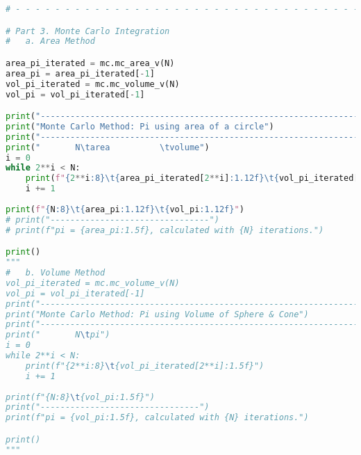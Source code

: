 \documentclass[11pt]{article}
\begin{document}
\begin{lstlisting}[language=Python]
# - - - - - - - - - - - - - - - - - - - - - - - - - - - - - - - - - - - - - - -

# Part 3. Monte Carlo Integration
#   a. Area Method

area_pi_iterated = mc.mc_area_v(N)
area_pi = area_pi_iterated[-1]
vol_pi_iterated = mc.mc_volume_v(N)
vol_pi = vol_pi_iterated[-1]

print("----------------------------------------------------------------")
print("Monte Carlo Method: Pi using area of a circle")
print("----------------------------------------------------------------")
print("       N\tarea          \tvolume")
i = 0
while 2**i < N:
    print(f"{2**i:8}\t{area_pi_iterated[2**i]:1.12f}\t{vol_pi_iterated[2**i]:1.12f}")
    i += 1
    
print(f"{N:8}\t{area_pi:1.12f}\t{vol_pi:1.12f}")
# print("--------------------------------")
# print(f"pi = {area_pi:1.5f}, calculated with {N} iterations.")

print()
"""
#   b. Volume Method
vol_pi_iterated = mc.mc_volume_v(N)
vol_pi = vol_pi_iterated[-1]
print("----------------------------------------------------------------")
print("Monte Carlo Method: Pi using Volume of Sphere & Cone")
print("----------------------------------------------------------------")
print("       N\tpi")
i = 0
while 2**i < N:
    print(f"{2**i:8}\t{vol_pi_iterated[2**i]:1.5f}")
    i += 1
    
print(f"{N:8}\t{vol_pi:1.5f}")
print("--------------------------------")
print(f"pi = {vol_pi:1.5f}, calculated with {N} iterations.")

print()
"""

\end{lstlisting} 
\end{document}
